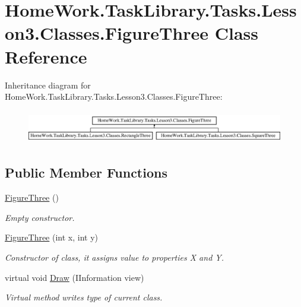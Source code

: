 \hypertarget{class_home_work_1_1_task_library_1_1_tasks_1_1_lesson3_1_1_classes_1_1_figure_three}{}\section{Home\+Work.\+Task\+Library.\+Tasks.\+Lesson3.\+Classes.\+Figure\+Three Class Reference}
\label{class_home_work_1_1_task_library_1_1_tasks_1_1_lesson3_1_1_classes_1_1_figure_three}
Inheritance diagram for Home\+Work.\+Task\+Library.\+Tasks.\+Lesson3.\+Classes.\+Figure\+Three\+:\begin{figure}[H]
\begin{center}
\leavevmode
\includegraphics[height=1.473684cm]{class_home_work_1_1_task_library_1_1_tasks_1_1_lesson3_1_1_classes_1_1_figure_three}
\end{center}
\end{figure}
\subsection*{Public Member Functions}
\begin{DoxyCompactItemize}
\item 
\mbox{\hyperlink{class_home_work_1_1_task_library_1_1_tasks_1_1_lesson3_1_1_classes_1_1_figure_three_a486d125984a7ebe4b51fe9f26a101bd4}{Figure\+Three}} ()
\begin{DoxyCompactList}\small\item\em Empty constructor. \end{DoxyCompactList}\item 
\mbox{\hyperlink{class_home_work_1_1_task_library_1_1_tasks_1_1_lesson3_1_1_classes_1_1_figure_three_a95507709ae564544da30e551d3f13fd8}{Figure\+Three}} (int x, int y)
\begin{DoxyCompactList}\small\item\em Constructor of class, it assigns value to properties X and Y. \end{DoxyCompactList}\item 
virtual void \mbox{\hyperlink{class_home_work_1_1_task_library_1_1_tasks_1_1_lesson3_1_1_classes_1_1_figure_three_a1dc44301b6143d7ec6e7089ed13d460e}{Draw}} (I\+Information view)
\begin{DoxyCompactList}\small\item\em Virtual method writes type of current class. \end{DoxyCompactList}\end{DoxyCompactItemize}

